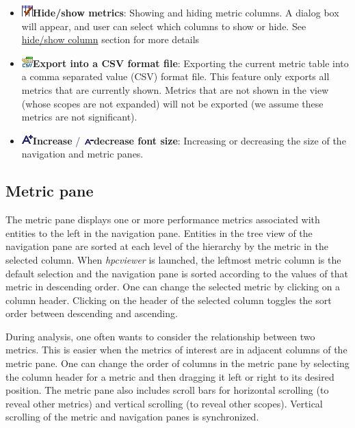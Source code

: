 \documentclass[a4paper,11pt]{article}
\begin{document}
\begin{itemize}
	\item 
\includegraphics{images/checkColumns.png}\textbf{Hide/show metrics}: Showing and hiding metric columns.   A dialog box will appear, and user can select which columns to show or hide. See \hyperlink{hideshowcolumn}{hide/show column} section for more details 
	\item 
\includegraphics{images/savecsv.png}\textbf{Export into a CSV format file}: Exporting the current metric table into a comma separated value (CSV) format file.  This feature only exports all metrics that are currently shown.  Metrics that are not shown in the view (whose scopes are not expanded) will not be exported (we assume these metrics are not significant).    
	\item 
\includegraphics{images/FontBigger.png}\textbf{Increase} / 
\includegraphics{images/FontSmaller.png}\textbf{decrease font size}: Increasing or decreasing the size of the navigation and metric panes.  
\end{itemize}

\subsection{Metric pane} The metric pane displays one or more performance metrics associated with entities to the left in the navigation pane. Entities  in the tree view of the navigation pane are sorted at each level of the  hierarchy by the metric in the selected column. When \textit{hpcviewer} is  launched, the leftmost metric column is the default selection and the  navigation pane is sorted according to the values of that metric in descending order. One can change the selected metric by clicking on a  column header. Clicking on the header of the selected column toggles  the sort order between descending and ascending.  

 During analysis, one often wants to consider the relationship between  two metrics. This is easier when the metrics of interest are in adjacent  columns of the metric pane. One can change the order of columns in  the metric pane by selecting the column header for a metric and then  dragging it left or right to its desired position. The metric pane also  includes scroll bars for horizontal scrolling (to reveal other metrics)  and vertical scrolling (to reveal other scopes). Vertical scrolling of the  metric and navigation panes is synchronized. 
\end{document}
